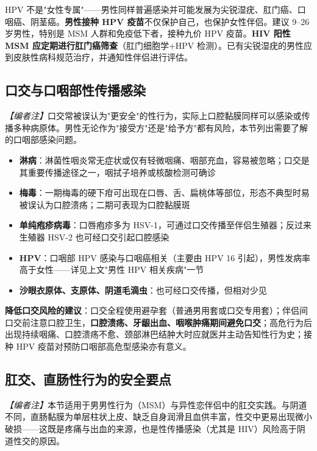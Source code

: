 \begin{tcolorbox}[colback=pink!5!white,colframe=red!50!black,title=贴心小叮咛]
HPV 不是"女性专属"——男性同样普遍感染并可能发展为尖锐湿疣、肛门癌、口咽癌、阴茎癌。\textbf{男性接种 HPV 疫苗}不仅保护自己，也保护女性伴侣。建议 9--26 岁男性，特别是 MSM 人群和免疫低下者，接种九价 HPV 疫苗。\textbf{HIV 阳性 MSM 应定期进行肛门癌筛查}（肛门细胞学+HPV 检测）。已有尖锐湿疣的男性应到皮肤性病科规范治疗，并通知性伴侣进行评估。
\end{tcolorbox}

\subsection{口交与口咽部性传播感染}

\noindent\textit{【编者注】}口交常被误认为"更安全"的性行为，实际上口腔黏膜同样可以感染或传播多种病原体。男性无论作为"接受方"还是"给予方"都有风险，本节列出需要了解的口咽部感染问题。

\begin{itemize}[leftmargin=2cm]
	\item \textbf{淋病}：淋菌性咽炎常无症状或仅有轻微咽痛、咽部充血，容易被忽略；口交是其重要传播途径之一，咽拭子培养或核酸检测可确诊
	\item \textbf{梅毒}：一期梅毒的硬下疳可出现在口唇、舌、扁桃体等部位，形态不典型时易被误认为口腔溃疡；二期可表现为口腔黏膜斑
	\item \textbf{单纯疱疹病毒}：口唇疱疹多为 HSV-1，可通过口交传播至伴侣生殖器；反过来生殖器 HSV-2 也可经口交引起口腔感染
	\item \textbf{HPV}：口咽部 HPV 感染与口咽癌相关（主要由 HPV 16 引起），男性发病率高于女性——详见上文"男性 HPV 相关疾病"一节
	\item \textbf{沙眼衣原体、支原体、阴道毛滴虫}：也可经口交传播，但相对少见
\end{itemize}

\textbf{降低口交风险的建议}：口交全程使用避孕套（普通男用套或口交专用套）；伴侣间口交前注意口腔卫生，\textbf{口腔溃疡、牙龈出血、咽喉肿痛期间避免口交}；高危行为后出现持续咽痛、口腔溃疡不愈、颈部淋巴结肿大时应就医并主动告知性行为史；接种 HPV 疫苗对预防口咽部高危型感染亦有意义。

\subsection{肛交、直肠性行为的安全要点}

\noindent\textit{【编者注】}本节适用于男男性行为（MSM）与异性恋伴侣中的肛交实践。与阴道不同，直肠黏膜为单层柱状上皮、缺乏自身润滑且血供丰富，性交中更易出现微小破损——这既是疼痛与出血的来源，也是性传播感染（尤其是 HIV）风险高于阴道性交的原因。

